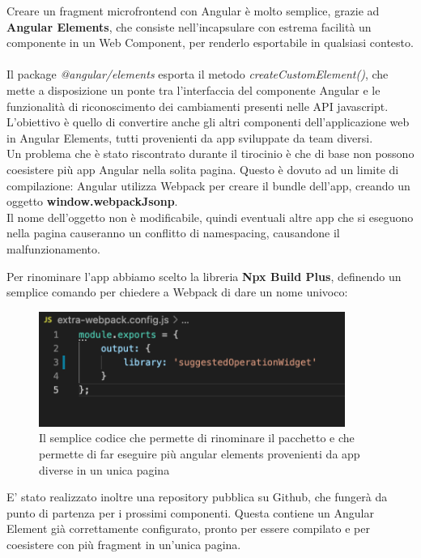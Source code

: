 Creare un fragment microfrontend con Angular è molto semplice, grazie ad
\textbf{Angular Elements}, che consiste nell'incapsulare con estrema facilità un componente in un Web Component, per renderlo
esportabile in qualsiasi contesto.
\\\\
Il package \emph{@angular/elements} esporta il metodo \emph{createCustomElement()}, che mette a disposizione un ponte tra
l'interfaccia del componente Angular e le funzionalità di riconoscimento dei cambiamenti presenti nelle API javascript.
\\
L'obiettivo è quello di convertire anche gli altri componenti dell'applicazione web in Angular Elements, tutti provenienti da app
sviluppate da team diversi.\\
Un problema che è stato riscontrato durante il tirocinio è che di base non possono coesistere più app Angular nella solita pagina.
Questo è dovuto ad un limite di compilazione: Angular utilizza Webpack per creare il bundle dell'app, creando un oggetto \textbf{window.webpackJsonp}.
\\Il nome dell'oggetto non è modificabile, quindi eventuali altre app che si eseguono nella pagina causeranno un conflitto di namespacing, causandone
il malfunzionamento. \cite{webpackModifica}

Per rinominare l'app abbiamo scelto la libreria \textbf{Npx Build Plus}, definendo un semplice comando per chiedere a Webpack di 
dare un nome univoco:

\begin{figure}[H]
    \centering
    \includegraphics[width=100mm]{img/webpack-extra.png}
    \caption{Il semplice codice che permette di rinominare il pacchetto e che permette di 
    far eseguire più angular elements provenienti da app diverse in un unica pagina}
  \end{figure}


E' stato realizzato inoltre una repository pubblica su Github, che fungerà da punto di partenza per i prossimi componenti. 
Questa contiene un Angular Element già correttamente configurato, pronto per essere compilato e 
per coesistere con più fragment in un'unica pagina.\cite{repogit}


